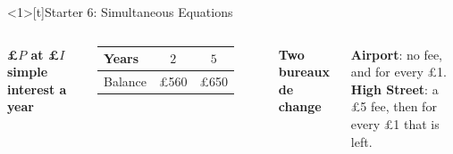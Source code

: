 \documentclass{beamer}
\newcommand{\receipt}[4]{%
  \draw[fill=yellow!4, draw=black!60]
    (#1,0) -- ({#1+1.95},0) -- ({#1+1.95},-1.3)
    \foreach \i in {1,...,6} { -- ({#1+1.95-0.325*\i+0.1625},-1.38) -- ({#1+1.95-0.325*\i},-1.3) }
    -- cycle;
  \node[anchor=west] at ({#1+0.1},-0.25) {#2};
  \node[anchor=west] at ({#1+0.1},-0.58) {#3};
  \draw[black!50, dashed] ({#1+0.1},-0.8) -- ({#1+1.85},-0.8);
  \node[anchor=west, font=\scriptsize\bfseries] at ({#1+0.1},-1.05) {Total};
  \node[anchor=east] at ({#1+1.85},-1.05) {#4};
}
\begin{document}
\begin{frame}<1>[t]{Starter 6: Simultaneous Equations}
\begin{columns}[T,onlytextwidth]

\vspace{-0.4em}

\vspace{0.8em}
{\scriptsize\bfseries \pounds$P$ at \pounds$I$ simple interest a year}\par
\vspace{0.2em}
{\scriptsize
\renewcommand{\arraystretch}{1.3}
\begin{tabular}{l|c|c}
  Years   & $2$        & $5$\\ \hline
  Balance & \pounds560 & \pounds650
\end{tabular}}

\vspace{0.9em}
{\scriptsize\bfseries Two bureaux de change}\par
\vspace{0.2em}
\parbox{\linewidth}{\raggedright\scriptsize
  \textbf{Airport}: no fee, and  for every \pounds1.\\[2pt]
  \textbf{High Street}: a \pounds5 fee, then  for every \pounds1 that is left.}


\end{columns}
\end{frame}
\end{document}
